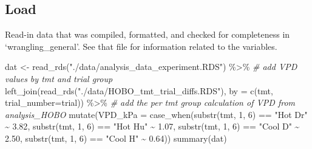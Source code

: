 \documentclass[
]{article}
\newenvironment{Shaded}{\begin{snugshade}}{\end{snugshade}}
\newcommand{\AttributeTok}[1]{\textcolor[rgb]{0.77,0.63,0.00}{#1}}
\newcommand{\CommentTok}[1]{\textcolor[rgb]{0.56,0.35,0.01}{\textit{#1}}}
\newcommand{\DecValTok}[1]{\textcolor[rgb]{0.00,0.00,0.81}{#1}}
\newcommand{\FloatTok}[1]{\textcolor[rgb]{0.00,0.00,0.81}{#1}}
\newcommand{\FunctionTok}[1]{\textcolor[rgb]{0.00,0.00,0.00}{#1}}
\newcommand{\NormalTok}[1]{#1}
\newcommand{\OtherTok}[1]{\textcolor[rgb]{0.56,0.35,0.01}{#1}}
\newcommand{\SpecialCharTok}[1]{\textcolor[rgb]{0.00,0.00,0.00}{#1}}
\newcommand{\StringTok}[1]{\textcolor[rgb]{0.31,0.60,0.02}{#1}}
\begin{document}
\hypertarget{load}{%
\subsection{Load}\label{load}}

Read-in data that was compiled, formatted, and checked for completeness
in `wrangling\_general'. See that file for information related to the
variables.

\begin{Shaded}
\begin{Highlighting}[]
\NormalTok{dat }\OtherTok{\textless{}{-}} \FunctionTok{read\_rds}\NormalTok{(}\StringTok{"./data/analysis\_data\_experiment.RDS"}\NormalTok{) }\SpecialCharTok{\%\textgreater{}\%}
  \CommentTok{\# add VPD values by tmt and trial group}
  \FunctionTok{left\_join}\NormalTok{(}\FunctionTok{read\_rds}\NormalTok{(}\StringTok{"./data/HOBO\_tmt\_trial\_diffs.RDS"}\NormalTok{), }
            \AttributeTok{by =} \FunctionTok{c}\NormalTok{(}\StringTok{\textquotesingle{}tmt\textquotesingle{}}\NormalTok{, }\StringTok{\textquotesingle{}trial\_number\textquotesingle{}}\OtherTok{=}\StringTok{\textquotesingle{}trial\textquotesingle{}}\NormalTok{)) }\SpecialCharTok{\%\textgreater{}\%}
  \CommentTok{\# add the per tmt group calculation of VPD from analysis\_HOBO}
  \FunctionTok{mutate}\NormalTok{(}\AttributeTok{VPD\_kPa =} \FunctionTok{case\_when}\NormalTok{(}\FunctionTok{substr}\NormalTok{(tmt, }\DecValTok{1}\NormalTok{, }\DecValTok{6}\NormalTok{) }\SpecialCharTok{==} \StringTok{"Hot Dr"} \SpecialCharTok{\textasciitilde{}} \FloatTok{3.82}\NormalTok{,}
                             \FunctionTok{substr}\NormalTok{(tmt, }\DecValTok{1}\NormalTok{, }\DecValTok{6}\NormalTok{) }\SpecialCharTok{==} \StringTok{"Hot Hu"} \SpecialCharTok{\textasciitilde{}} \FloatTok{1.07}\NormalTok{,}
                             \FunctionTok{substr}\NormalTok{(tmt, }\DecValTok{1}\NormalTok{, }\DecValTok{6}\NormalTok{) }\SpecialCharTok{==} \StringTok{"Cool D"} \SpecialCharTok{\textasciitilde{}} \FloatTok{2.50}\NormalTok{,}
                             \FunctionTok{substr}\NormalTok{(tmt, }\DecValTok{1}\NormalTok{, }\DecValTok{6}\NormalTok{) }\SpecialCharTok{==} \StringTok{"Cool H"} \SpecialCharTok{\textasciitilde{}} \FloatTok{0.64}\NormalTok{))}
\FunctionTok{summary}\NormalTok{(dat)}
\end{Highlighting}
\end{Shaded}
\end{document}
